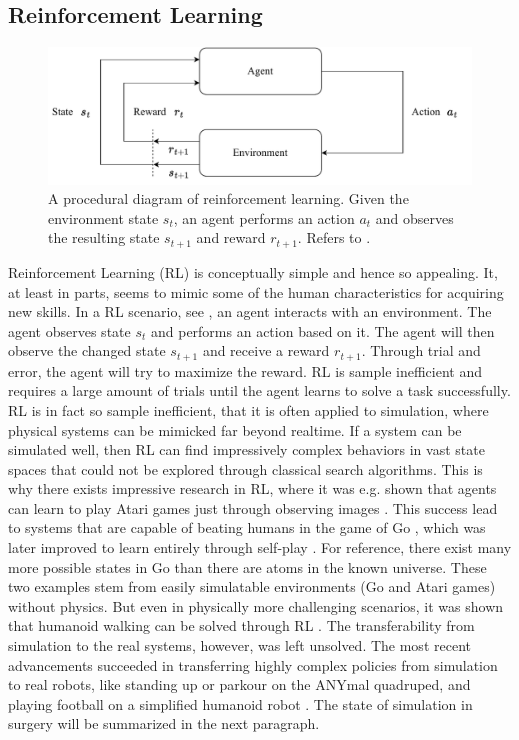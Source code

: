 \subsection{Reinforcement Learning}
\label{in:sec:reinforcement_learning}
\begin{figure}
    \centering
    \includegraphics[width=\textwidth]{introduction/fig/reinforcement_learning.pdf}
    \caption{A procedural diagram of reinforcement learning. Given the environment state $s_t$, an agent performs an action $a_t$ and observes the resulting state $s_{t+1}$ and reward $r_{t+1}$. Refers to .}
    \label{in:fig:reinforcement_learning}
\end{figure}
Reinforcement Learning (RL) is conceptually simple and hence so appealing. It, at least in parts, seems to mimic some of the human characteristics for acquiring new skills. In a RL scenario, see , an agent interacts with an environment. The agent observes state $s_t$ and performs an action based on it. The agent will then observe the changed state $s_{t+1}$ and receive a reward $r_{t+1}$. Through trial and error, the agent will try to maximize the reward. RL is sample inefficient and requires a large amount of trials until the agent learns to solve a task successfully. RL is in fact so sample inefficient, that it is often applied to simulation, where physical systems can be mimicked far beyond realtime. If a system can be simulated well, then RL can find impressively complex behaviors in vast state spaces that could not be explored through classical search algorithms. This is why there exists impressive research in RL, where it was e.g. shown that agents can learn to play Atari games just through observing images \cite{mnih2013playing}. This success lead to systems that are capable of beating humans in the game of Go \cite{silver2016mastering}, which was later improved to learn entirely through self-play \cite{silver2017mastering}. For reference, there exist many more possible states in Go than there are atoms in the known universe. These two examples stem from easily simulatable environments (Go and Atari games) without physics. But even in physically more challenging scenarios, it was shown that humanoid walking can be solved through RL \cite{schulman2017proximal}. The transferability from simulation to the real systems, however, was left unsolved. The most recent advancements succeeded in transferring highly complex policies from simulation to real robots, like standing up \cite{rudin2022learning} or parkour \cite{hoeller2023anymal} on the ANYmal quadruped, and playing football on a simplified humanoid robot \cite{liu2022motor}. The state of simulation in surgery will be summarized in the next paragraph.

